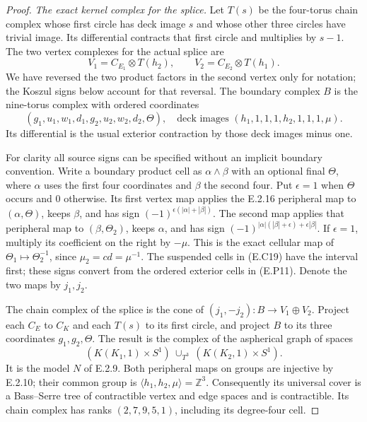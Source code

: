 \begin{proof}
\emph{The exact kernel complex for the splice.}
Let $T(s)$ be the four-torus chain complex whose
first circle has deck image $s$ and whose other
three circles have trivial image. Its differential
contracts that first circle and multiplies by $s-1$.
The two vertex complexes for the actual splice are
\[
 V_1=C_{E_1}\otimes T(h_2),\qquad
 V_2=C_{E_2}\otimes T(h_1).
 \tag{E.P10}
\]
We have reversed the two product factors in the
second vertex only for notation; the Koszul signs
below account for that reversal. The boundary
complex $B$ is the nine-torus complex with ordered
coordinates
\[
 (g_1,u_1,w_1,d_1,g_2,u_2,w_2,d_2,\Theta),
 \quad\text{deck images }(h_1,1,1,1,h_2,1,1,1,\mu).
 \tag{E.P11}
\]
Its differential is the usual exterior contraction
by those deck images minus one.

For clarity all source signs can be specified
without an implicit boundary convention. Write
a boundary product cell as $\alpha\wedge\beta$
with an optional final $\Theta$, where $\alpha$
uses the first four coordinates and $\beta$ the
second four. Put $\epsilon=1$ when $\Theta$ occurs
and $0$ otherwise. Its first vertex map applies
the E.2.16 peripheral map to $(\alpha,\Theta)$,
keeps $\beta$, and has sign
$(-1)^{\epsilon(|\alpha|+|\beta|)}$.
The second map applies that peripheral map to
$(\beta,\Theta_2)$, keeps $\alpha$, and has sign
$(-1)^{|\alpha|(|\beta|+\epsilon)+\epsilon|\beta|}$.
If $\epsilon=1$, multiply its coefficient on the
right by $-\mu$. This is the exact cellular map
of $\Theta_1\mapsto\Theta_2^{-1}$, since
$\mu_2=cd=\mu^{-1}$. The suspended cells in (E.C19)
have the interval first; these signs convert from
the ordered exterior cells in (E.P11).
Denote the two maps by $j_1,j_2$.

The chain complex of the splice is the cone of
$(j_1,-j_2):B\to V_1\oplus V_2$.
Project each $C_E$ to $C_K$ and each $T(s)$ to its
first circle, and project $B$ to its three coordinates
$g_1,g_2,\Theta$. The result is the complex of the
aspherical graph of spaces
\[
 (K(K_1,1)\times S^1)\ \cup_{T^3}\
                         (K(K_2,1)\times S^1).
 \tag{E.P12}
\]
It is the model $N$ of E.2.9. Both peripheral maps
on groups are injective by E.2.10; their common
group is $\langle h_1,h_2,\mu\rangle=\mathbb Z^3$.
Consequently its universal cover is a Bass--Serre
tree of contractible vertex and edge spaces and
is contractible. Its chain complex has ranks
$(2,7,9,5,1)$, including its degree-four cell.


\end{proof}
